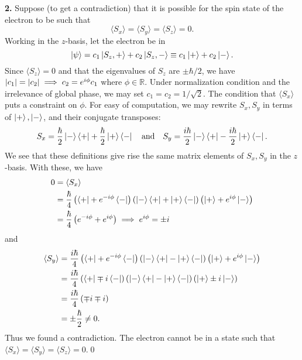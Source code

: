 \documentclass{article}
\theoremstyle{definition}
\newcommand{\f}[2]{\frac{#1}{#2}}
\newcommand{\lp}{\left(}
\newcommand{\rp}{\right)}
\begin{document}
\noindent \textbf{2.} Suppose (to get a contradiction) that it is possible for the spin state of the electron to be such that
\begin{equation*}
\langle S_x \rangle = \langle S_y \rangle = \langle S_z \rangle = 0.
\end{equation*}
Working in the $z$-basis, let the electron be in 
\begin{equation*}
\ket{\psi} = c_1 \ket{S_z, +} + c_2 \ket{S_z, -} \equiv c_1 \ket{+} + c_2 \ket{-}. 
\end{equation*}
Since $\langle S_z \rangle = 0$ and that the eigenvalues of $S_z$ are $\pm \hbar/2$, we have $\abs{c_1} = \abs{c_2} \implies c_2 = e^{i\phi} c_1$ where $\phi \in \mathbb{R}$.  Under normalization condition and the irrelevance of global phase, we may set $c_1 = c_2 = 1/\sqrt{2}$. The condition that $\langle S_x \rangle$ puts a constraint on $\phi$. For easy of computation, we may rewrite $S_x, S_y$ in terms of $\ket{+}, \ket{-}$, and their conjugate transposes:
\begin{equation*}
S_x = \f{\hbar}{2} \ket{-}\bra{+} + \f{\hbar}{2}\ket{+}\bra{-} \quad\text{and}\quad S_y = \f{i\hbar}{2} \ket{-}\bra{+} - \f{i\hbar}{2}\ket{+}\bra{-}.
\end{equation*}
We see that these definitions give rise the same matrix elements of $S_x,S_y$ in the $z$-basis. With these, we have
\begin{align*}
0 
&= \langle S_x \rangle \\
&= \f{\hbar}{4}\lp \bra{+} + e^{-i\phi} \bra{-} \rp \lp \ket{-}\bra{+} + \ket{+}\bra{-} \rp \lp \ket{+} + e^{i\phi} \ket{-} \rp\\
&= \f{\hbar}{4}\lp e^{-i\phi} + e^{i\phi}  \rp 
\implies e^{i\phi} = \pm i
\end{align*}
and 
\begin{align*}
\langle S_y \rangle 
&= \f{i\hbar}{4}\lp \bra{+} + e^{-i\phi} \bra{-} \rp 
\lp \ket{-}\bra{+} - \ket{+}\bra{-}\rp 
\lp \ket{+} + e^{i\phi} \ket{-} \rp\\
&= \f{i\hbar}{4}\lp \bra{+} \mp i\bra{-} \rp 
\lp \ket{-}\bra{+} - \ket{+}\bra{-}\rp 
\lp \ket{+} \pm i \ket{-} \rp\\
&= \f{i\hbar}{4}\lp \mp i \mp i \rp \\
&= \pm \f{\hbar}{2}\neq 0.
\end{align*}
Thus we found a contradiction. The electron cannot be in a state such that $\langle S_x\rangle = \langle S_y \rangle = \langle S_z\rangle = 0$.\qed
\end{document}
